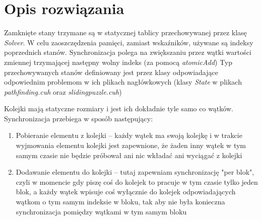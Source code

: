 \documentclass{article}
\begin{document}
\section{Opis rozwiązania}
Zamknięte stany trzymane są w statycznej tablicy przechowywanej przez klasę \emph{Solver}. 
W celu zaoszczędzenia pamięci, zamiast wskaźników, używane są indeksy poprzednich stanów.
Synchronizacja polega na zwiększaniu przez wątki wartości zmiennej trzymającej następny wolny indeks (za pomocą \emph{atomicAdd})
Typ przechowywanych stanów definiowany jest przez klasy odpowiadające odpowiednim problemom w ich plikach nagłówkowych
(klasy \emph{State} w plikach \emph{pathfinding.cuh} oraz \emph{slidingpuzzle.cuh})

Kolejki mają statyczne rozmiary i jest ich dokładnie tyle samo co wątków. Synchronizacja przebiega w sposób następujący:
\begin{enumerate}
 \item Pobieranie elementu z kolejki -- każdy wątek ma swoją kolejkę i w trakcie wyjmowania elementu kolejki jest zapewnione, 
          że żaden inny wątek w tym samym czasie nie będzie próbował ani nic wkładać ani wyciągać z kolejki
 \item Dodawanie elementu do kolejki -- tutaj zapewniam synchronizację "per blok", czyli w momencie gdy piszę coś do kolejek to pracuje w tym czasie
          tylko jeden blok, a każdy wątek wpisuje coś wyłącznie do kolejek odpowiadających wątkom o tym samym indeksie w bloku, 
          tak aby nie była konieczna synchronizacja pomiędzy wątkami w tym samym bloku
\end{enumerate}
\end{document}
